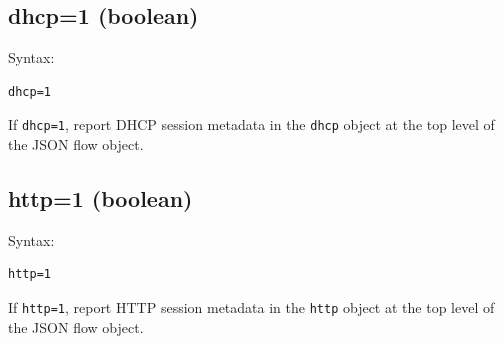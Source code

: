 \documentclass{book}
\begin{document}
 

\subsection{dhcp=1 (boolean)}
\label{dhcp}
\begin{mdframed}[style=aaa]
Syntax:
  \begin{verbatim}
dhcp=1                     
  \end{verbatim}
\end{mdframed}
If \texttt{dhcp=1}, report DHCP session metadata in the \texttt{dhcp}
object at the top level of the JSON flow object.

\subsection{http=1 (boolean)}
\label{http}
\begin{mdframed}[style=aaa]
Syntax:
  \begin{verbatim}
http=1
  \end{verbatim}
\end{mdframed}
If \texttt{http=1}, report HTTP session metadata in the \texttt{http}
object at the top level of the JSON flow object.
\end{document}
